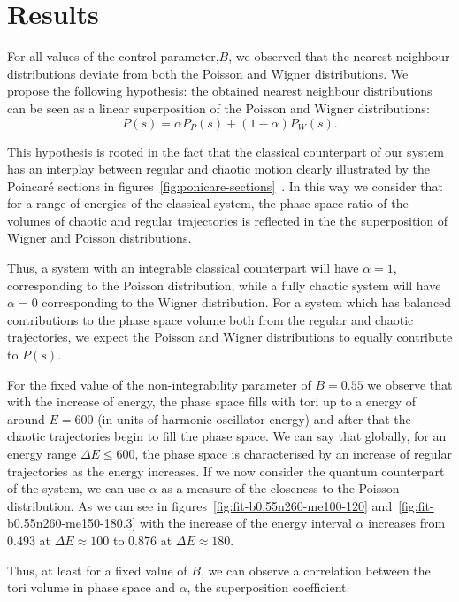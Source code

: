 \documentclass[../thesis.tex]{subfiles}
\begin{document}
\chapter{Results}
\label{chap:results}

For all values of the control parameter,\(B\), we observed that the
nearest neighbour distributions deviate from both the Poisson and Wigner distributions.
We propose the following hypothesis: the obtained nearest neighbour distributions
can be seen as a linear superposition of the
Poisson and Wigner distributions:
\[
  P(s) = \alpha P_P(s) + (1-\alpha) P_W(s).
\]

This hypothesis is rooted in the fact that the classical counterpart of our system
has an interplay between regular and chaotic motion clearly illustrated by the Poincaré
sections in figures~\ref{fig:ponicare-sections}~\cite{Baran1998}.
In this way we consider that for a range of energies of the classical system,
the phase space ratio of the volumes of chaotic and regular trajectories is
reflected in the the superposition of Wigner and Poisson distributions.

Thus, a system with an integrable classical counterpart will have \({\alpha=1}\),
corresponding to the Poisson distribution, while a fully chaotic
system will have \(\alpha=0\) corresponding to the Wigner distribution. For
a system which has balanced contributions to the phase space volume both from
the regular and chaotic trajectories, we expect the Poisson and Wigner distributions
to equally contribute to \(P(s)\).

For the fixed value of the non-integrability parameter of \(B=0.55\) we observe that
with the increase of energy, the phase space fills with tori up to a energy of
around \(E=600\) (in units of harmonic oscillator energy) and after that the chaotic trajectories begin to fill
the phase space. We can say that globally, for an energy range \(\Delta E \leq 600\),
the phase space is characterised by an increase of regular trajectories as the
energy increases. If we now consider the quantum counterpart of the system, we
can use \(\alpha \) as a measure of the closeness to the Poisson distribution.
As we can see in figures~\ref{fig:fit-b0.55n260-me100-120} and~\ref{fig:fit-b0.55n260-me150-180.3}
with the increase of the energy interval \(\alpha \) increases from \(0.493\) at
\(\Delta E \approx 100 \) to \(0.876\) at \(\Delta E \approx 180 \).

Thus, at least for a fixed value of $B$, we can observe a correlation between
the tori volume in phase space and \(\alpha \), the superposition coefficient.
\end{document}
